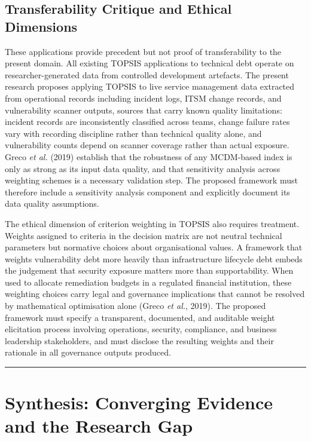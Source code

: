 \documentclass[
  british,
  12pt,
  a4paper,
]{report}
\begin{document}
\subsection{Transferability Critique and Ethical
Dimensions}\label{transferability-critique-and-ethical-dimensions}

These applications provide precedent but not proof of transferability to
the present domain. All existing TOPSIS applications to technical debt
operate on researcher-generated data from controlled development
artefacts. The present research proposes applying TOPSIS to live service
management data extracted from operational records including incident
logs, ITSM change records, and vulnerability scanner outputs, sources
that carry known quality limitations: incident records are
inconsistently classified across teams, change failure rates vary with
recording discipline rather than technical quality alone, and
vulnerability counts depend on scanner coverage rather than actual
exposure. Greco \emph{et al.} (2019) establish that the robustness of
any MCDM-based index is only as strong as its input data quality, and
that sensitivity analysis across weighting schemes is a necessary
validation step. The proposed framework must therefore include a
sensitivity analysis component and explicitly document its data quality
assumptions.

The ethical dimension of criterion weighting in TOPSIS also requires
treatment. Weights assigned to criteria in the decision matrix are not
neutral technical parameters but normative choices about organisational
values. A framework that weights vulnerability debt more heavily than
infrastructure lifecycle debt embeds the judgement that security
exposure matters more than supportability. When used to allocate
remediation budgets in a regulated financial institution, these
weighting choices carry legal and governance implications that cannot be
resolved by mathematical optimisation alone (Greco \emph{et al.}, 2019).
The proposed framework must specify a transparent, documented, and
auditable weight elicitation process involving operations, security,
compliance, and business leadership stakeholders, and must disclose the
resulting weights and their rationale in all governance outputs
produced.

\begin{center}\rule{0.5\linewidth}{0.5pt}\end{center}

\section{Synthesis: Converging Evidence and the Research
Gap}\label{synthesis-converging-evidence-and-the-research-gap}
\end{document}
